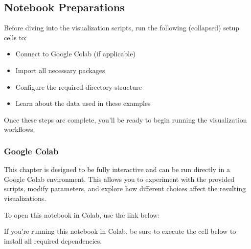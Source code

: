 \documentclass[letterpaper,10pt,english]{jupyterBook}
\begin{document}
\subsection{Notebook Preparations}
\label{\detokenize{chapters/03/03c_visualization-examples:notebook-preparations}}
\sphinxAtStartPar
Before diving into the visualization scripts, run the following (collapsed) setup cells to:
\begin{itemize}
\item {} 
\sphinxAtStartPar
Connect to Google Colab (if applicable)

\item {} 
\sphinxAtStartPar
Import all necessary packages

\item {} 
\sphinxAtStartPar
Configure the required directory structure

\item {} 
\sphinxAtStartPar
Learn about the data used in these examples

\end{itemize}

\sphinxAtStartPar
Once these steps are complete, you’ll be ready to begin running the visualization workflows.




\subsubsection{Google Colab}
\label{\detokenize{chapters/03/03c_visualization-examples:google-colab}}
\sphinxAtStartPar
This chapter is designed to be fully interactive and can be run directly in a Google Colab environment. This allows you to experiment with the provided scripts, modify parameters, and explore how different choices affect the resulting visualizations.

\sphinxAtStartPar
To open this notebook in Colab, use the link below:



\sphinxAtStartPar
If you’re running this notebook in Colab, be sure to execute the cell below to install all required dependencies.
\end{document}

